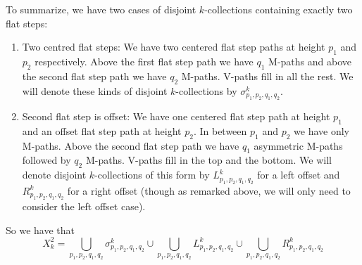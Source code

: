 \documentclass[11pt]{article}
\theoremstyle{mythm}
\begin{document}
To summarize, we have two cases of disjoint $k$-collections containing exactly two flat steps:
\begin{enumerate}[label=(\alph*)]
\item Two centred flat steps: We have two centered flat step paths at height $p_1$ and $p_2$ respectively. Above the first flat step path we have $q_1$ M-paths and above the second flat step path we have $q_2$ M-paths. V-paths fill in all the rest. We will denote these kinds of disjoint $k$-collections by $\sigma_{p_1,p_2,q_1,q_2}^k$.
\item Second flat step is offset: We have one centered flat step path at height $p_1$ and an offset flat step path at height $p_2$. In between $p_1$ and $p_2$ we have only M-paths. Above the second flat step path we have $q_1$ asymmetric M-paths followed by $q_2$ M-paths. V-paths fill in the top and the bottom. We will denote disjoint $k$-collections of this form by $L_{p_1,p_2,q_1,q_2}^k$ for a left offset and $R_{p_1,p_2,q_1,q_2}^k$ for a right offset (though as remarked above, we will only need to consider the left offset case).
\end{enumerate}

So we have that
\begin{equation*}
X_{k}^2 = \bigcup\limits_{p_1,p_2,q_1,q_2}\sigma_{p_1,p_2,q_1,q_2}^k \cup \bigcup\limits_{p_1,p_2,q_1,q_2}L_{p_1,p_2,q_1,q_2}^k \cup \bigcup\limits_{p_1,p_2,q_1,q_2}R_{p_1,p_2,q_1,q_2}^k
\end{equation*}
\end{document}
